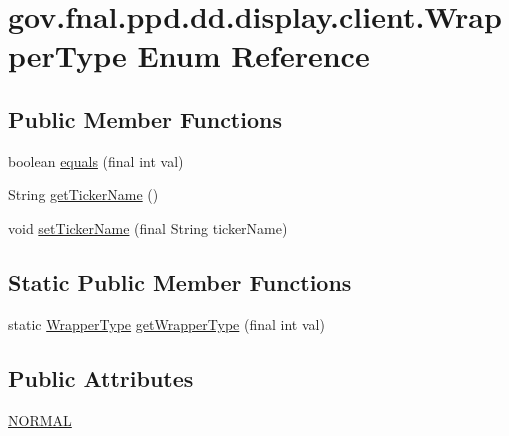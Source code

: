 \hypertarget{enumgov_1_1fnal_1_1ppd_1_1dd_1_1display_1_1client_1_1WrapperType}{\section{gov.\-fnal.\-ppd.\-dd.\-display.\-client.\-Wrapper\-Type Enum Reference}
\label{enumgov_1_1fnal_1_1ppd_1_1dd_1_1display_1_1client_1_1WrapperType}
}
\subsection*{Public Member Functions}
\begin{DoxyCompactItemize}
\item 
boolean \hyperlink{enumgov_1_1fnal_1_1ppd_1_1dd_1_1display_1_1client_1_1WrapperType_ac55bb15972a2ff7d1113f0f711a92ec9}{equals} (final int val)
\item 
String \hyperlink{enumgov_1_1fnal_1_1ppd_1_1dd_1_1display_1_1client_1_1WrapperType_a3b20342df009dd21fa06e11ffe23e4c9}{get\-Ticker\-Name} ()
\item 
void \hyperlink{enumgov_1_1fnal_1_1ppd_1_1dd_1_1display_1_1client_1_1WrapperType_a7e66f82fc6abcfb403dbf392013d333d}{set\-Ticker\-Name} (final String ticker\-Name)
\end{DoxyCompactItemize}
\subsection*{Static Public Member Functions}
\begin{DoxyCompactItemize}
\item 
static \hyperlink{enumgov_1_1fnal_1_1ppd_1_1dd_1_1display_1_1client_1_1WrapperType}{Wrapper\-Type} \hyperlink{enumgov_1_1fnal_1_1ppd_1_1dd_1_1display_1_1client_1_1WrapperType_a841e97a935cf4b038a279b4bd45f6bcc}{get\-Wrapper\-Type} (final int val)
\end{DoxyCompactItemize}
\subsection*{Public Attributes}
\begin{DoxyCompactItemize}
\item 
\hyperlink{enumgov_1_1fnal_1_1ppd_1_1dd_1_1display_1_1client_1_1WrapperType_a2ee7959af9c37c38f1d6710d9b26061e}{N\-O\-R\-M\-A\-L}
\end{DoxyCompactItemize}
